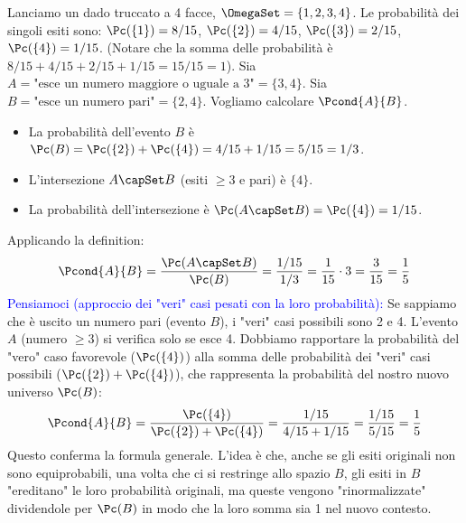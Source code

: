 \begin{example}
Lanciamo un dado truccato a 4 facce, $\OmegaSet = \{1, 2, 3, 4\}$.
Le probabilità dei singoli esiti sono:
$\Pc(\{1\}) = 8/15$, $\Pc(\{2\}) = 4/15$, $\Pc(\{3\}) = 2/15$, $\Pc(\{4\}) = 1/15$.
(Notare che la somma delle probabilità è $8/15+4/15+2/15+1/15 = 15/15 = 1$).
Sia $A = \text{"esce un numero maggiore o uguale a 3"} = \{3, 4\}$.
Sia $B = \text{"esce un numero pari"} = \{2, 4\}$.
Vogliamo calcolare $\Pcond{A}{B}$.

\begin{itemize}
    \item La probabilità dell'evento $B$ è $\Pc(B) = \Pc(\{2\}) + \Pc(\{4\}) = 4/15 + 1/15 = 5/15 = 1/3$.
    \item L'intersezione $A \capSet B$ (esiti $\ge 3$ e pari) è $\{4\}$.
    \item La probabilità dell'intersezione è $\Pc(A \capSet B) = \Pc(\{4\}) = 1/15$.
\end{itemize}
Applicando la definition:
\[ \Pcond{A}{B} = \frac{\Pc(A \capSet B)}{\Pc(B)} = \frac{1/15}{1/3} = \frac{1}{15} \cdot 3 = \frac{3}{15} = \frac{1}{5} \]
\textcolor{blue}{Pensiamoci (approccio dei "veri" casi pesati con la loro probabilità):} Se sappiamo che è uscito un numero pari (evento $B$), i "veri" casi possibili sono 2 e 4. L'evento $A$ (numero $\ge 3$) si verifica solo se esce 4. Dobbiamo rapportare la probabilità del "vero" caso favorevole ($\Pc(\{4\})$) alla somma delle probabilità dei "veri" casi possibili ($\Pc(\{2\}) + \Pc(\{4\})$), che rappresenta la probabilità del nostro nuovo universo $\Pc(B)$:
\[ \Pcond{A}{B} = \frac{\Pc(\{4\})}{\Pc(\{2\}) + \Pc(\{4\})} = \frac{1/15}{4/15 + 1/15} = \frac{1/15}{5/15} = \frac{1}{5} \]
Questo conferma la formula generale. L'idea è che, anche se gli esiti originali non sono equiprobabili, una volta che ci si restringe allo spazio $B$, gli esiti in $B$ "ereditano" le loro probabilità originali, ma queste vengono "rinormalizzate" dividendole per $\Pc(B)$ in modo che la loro somma sia 1 nel nuovo contesto.
\end{example}

